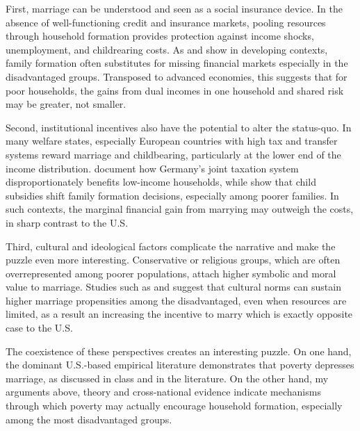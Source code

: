 First, marriage can be understood and seen as a social insurance device. In the absence of well-functioning credit and insurance markets, pooling resources through household formation provides protection against income shocks, unemployment, and childrearing costs. As \citet{RosenzweigStark1989} and \citet{Townsend1994} show in developing contexts, family formation often substitutes for missing financial markets especially in the disadvantaged groups. Transposed to advanced economies, this suggests that for poor households, the gains from dual incomes in one household and shared risk may be greater, not smaller.

Second, institutional incentives also have the potential to alter the status-quo. In many welfare states, especially European countries with high tax and transfer systems reward marriage and childbearing, particularly at the lower end of the income distribution. \citet{Steiner2011} document how Germany’s joint taxation system disproportionately benefits low-income households, while \citet{DoepkeKindermann2019} show that child subsidies shift family formation decisions, especially among poorer families. In such contexts, the marginal financial gain from marrying may outweigh the costs, in sharp contrast to the U.S.

Third, cultural and ideological factors complicate the narrative and make the puzzle even more interesting. Conservative or religious groups, which are often overrepresented among poorer populations, attach higher symbolic and moral value to marriage. Studies such as \citet{Glaeser2007} and \citet{Lesthaeghe2010} suggest that cultural norms can sustain higher marriage propensities among the disadvantaged, even when resources are limited, as a result an increasing the incentive to marry which is exactly opposite case to the U.S.

The coexistence of these perspectives creates an interesting puzzle. On one hand, the dominant U.S.-based empirical literature demonstrates that poverty depresses marriage, as discussed in class and in the literature. On the other hand, my arguments above, theory and cross-national evidence indicate mechanisms through which poverty may actually encourage household formation, especially among the most disadvantaged groups.

